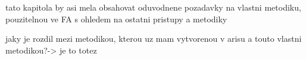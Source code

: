 \newcommand{\komentar}[1]{{\leavevmode\color[rgb]{1.0, 0.13, 0.32}#1}}
\newcommand{\sediva}[1]{{\leavevmode\color[rgb]{0.5, 0.5, 0.5}#1}}
\newcommand{\dotaz}[1]{{\leavevmode\color[rgb]{0.0, 0.5, 1.0}DOTAZ: #1\\}}
\newcommand{\anglictina}[1]{{\colorbox{green}{[AJ:] \leavevmode\color[rgb]{0.0, 0.0, 0.0}#1 }}}


\setcounter{chapter}{0}
\setcounter{section}{1}

 










\chapter{}
\komentar{
tato kapitola by asi mela obsahovat oduvodnene pozadavky na vlastni metodiku, pouzitelnou ve FA s ohledem na ostatni pristupy a metodiky
}

\komentar{jaky je rozdil mezi metodikou, kterou uz mam vytvorenou v arisu a touto vlastni metodikou?-> je to totez}

